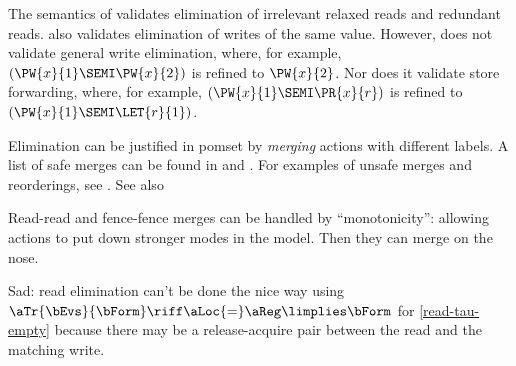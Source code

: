The semantics of 
validates elimination of irrelevant relaxed reads and redundant reads.
 also validates elimination of writes of the same value.
However,  does not validate general write elimination, where,
for example, $(\PW{x}{1}\SEMI\PW{x}{2})$ is refined to $\PW{x}{2}$.
Nor does it validate store forwarding, where, 
for example, $(\PW{x}{1}\SEMI\PR{x}{r})$ is refined to $(\PW{x}{1}\SEMI\LET{r}{1})$.

Elimination can be justified in pomset by \emph{merging} actions with
different labels.  A list of safe merges can be found in \cite[\textsection
E]{DBLP:conf/cgo/ChakrabortyV17} and \cite[]{Kang19}.  For
examples of unsafe merges and reorderings, see \cite[\textsection
D]{DBLP:conf/cgo/ChakrabortyV17}.
See also \cite[]{DBLP:journals/pacmpl/ChakrabortyV19}

Read-read and fence-fence merges can be handled by ``monotonicity'': allowing
actions to put down stronger modes in the model.  Then they can merge on the
nose.

Sad: read elimination can't be done the nice way using
\begin{math}
  \aTr{\bEvs}{\bForm} \riff \aLoc{=}\aReg  \limplies  \bForm
\end{math}
for \ref{read-tau-empty} because there may be a release-acquire pair between
the read and the matching write.

